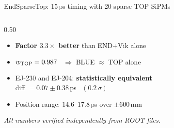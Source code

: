 \documentclass[aspectratio=169,9pt]{beamer}
\newcommand{\WTOP}{0.987}
\begin{document}
\begin{frame}{EndSparseTop: 15\,ps timing with 20 sparse TOP SiPMs}
\begin{columns}[T]
\begin{column}{0.50\textwidth}
\vspace{0.6em}
\begin{itemize}
  \item \textbf{Factor $3.3\times$ better} than END+Vik alone
  \item $w_{\rm TOP} = \WTOP$ \ $\Rightarrow$ BLUE $\approx$ TOP alone
  \item EJ-230 and EJ-204: \textbf{statistically equivalent}\\
        diff $= 0.07\pm0.38$\,ps \ $(0.2\,\sigma)$
  \item Position range: $14.6$--$17.8$\,ps over $\pm600$\,mm
\end{itemize}

\vspace{0.3em}
\textit{\scriptsize All numbers verified independently from ROOT files.}
\end{column}
\end{columns}
\end{frame}
\end{document}
